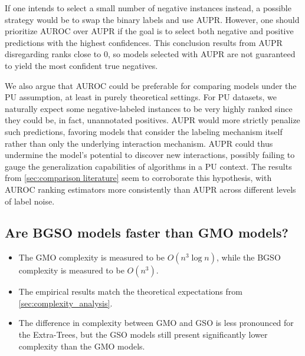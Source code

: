 If one intends to select a small number of negative instances instead, a possible strategy would be to swap the binary labels and use AUPR.
However, one should prioritize AUROC over AUPR if the goal is to select both negative and positive predictions with the highest confidences. This conclusion results from AUPR disregarding ranks close to $0$, so models selected with AUPR are not guaranteed to yield the most confident true negatives.

We also argue that AUROC could be preferable for comparing models under the PU assumption, at least in purely theoretical settings. For PU datasets, we naturally expect some negative-labeled instances to be very highly ranked since they could be, in fact, unannotated positives. AUPR would more strictly penalize such predictions, favoring models that consider the labeling mechanism itself rather than only the underlying interaction mechanism. AUPR could thus undermine the model's potential to discover new interactions, possibly failing to gauge the generalization capabilities of algorithms in a PU context. The results from \autoref{sec:comparison literature} seem to corroborate this hypothesis, with AUROC ranking estimators more consistently than AUPR across different levels of label noise.


\subsection{Are BGSO models faster than GMO models?}
\label{sec:empirical_complexity}

\begin{mdframed}[frametitle={Key findings}]
    \begin{itemize}
        \item The GMO complexity is measured to be $O(n^3\log n)$, while the BGSO complexity is measured to be $O(n^3)$.

        \item The empirical results match the theoretical expectations from \autoref{sec:complexity_analysis}.
        
        \item The difference in complexity between GMO and GSO is less pronounced for the Extra-Trees, but the GSO models still present significantly lower complexity than the GMO models.
    \end{itemize}
\end{mdframed}


